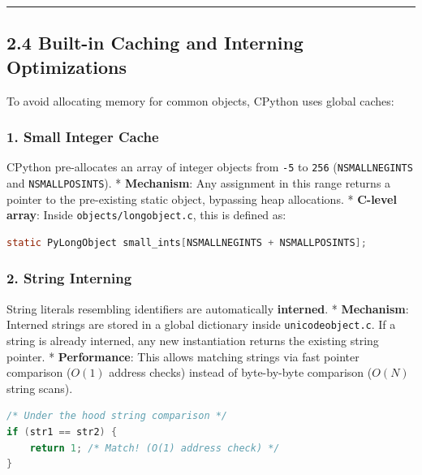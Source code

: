 \begin{center}\rule{0.5\linewidth}{0.5pt}\end{center}

\hypertarget{built-in-caching-and-interning-optimizations}{%
\subsection{2.4 Built-in Caching and Interning
Optimizations}\label{built-in-caching-and-interning-optimizations}}

To avoid allocating memory for common objects, CPython uses global
caches:

\hypertarget{small-integer-cache}{%
\subsubsection{1. Small Integer Cache}\label{small-integer-cache}}

CPython pre-allocates an array of integer objects from
\passthrough{\lstinline!-5!} to \passthrough{\lstinline!256!}
(\passthrough{\lstinline!NSMALLNEGINTS!} and
\passthrough{\lstinline!NSMALLPOSINTS!}). * \textbf{Mechanism}: Any
assignment in this range returns a pointer to the pre-existing static
object, bypassing heap allocations. * \textbf{C-level array}: Inside
\passthrough{\lstinline!objects/longobject.c!}, this is defined as:

\begin{lstlisting}[language=C]
static PyLongObject small_ints[NSMALLNEGINTS + NSMALLPOSINTS];
\end{lstlisting}

\hypertarget{string-interning}{%
\subsubsection{2. String Interning}\label{string-interning}}

String literals resembling identifiers are automatically
\textbf{interned}. * \textbf{Mechanism}: Interned strings are stored in
a global dictionary inside \passthrough{\lstinline!unicodeobject.c!}. If
a string is already interned, any new instantiation returns the existing
string pointer. * \textbf{Performance}: This allows matching strings via
fast pointer comparison (\(O(1)\) address checks) instead of
byte-by-byte comparison (\(O(N)\) string scans).

\begin{lstlisting}[language=C]
/* Under the hood string comparison */
if (str1 == str2) {
    return 1; /* Match! (O(1) address check) */
}
\end{lstlisting}

